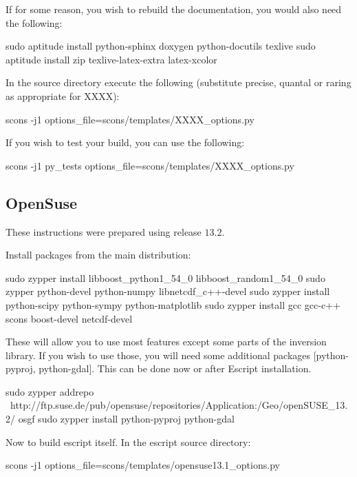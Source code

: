 \begin{optionalstep}
If for some reason, you wish to rebuild the documentation, you would also need the following:
\begin{shellCode}
sudo aptitude install python-sphinx doxygen python-docutils texlive 
sudo aptitude install zip texlive-latex-extra latex-xcolor 
\end{shellCode}
\end{optionalstep}

\noindent In the source directory execute the following (substitute precise, quantal or raring as appropriate for XXXX):
\begin{shellCode}
scons -j1 options_file=scons/templates/XXXX_options.py
\end{shellCode}

\noindent If you wish to test your build, you can use the following:
\begin{shellCode}
scons -j1 py_tests options_file=scons/templates/XXXX_options.py 
\end{shellCode}



\subsection{OpenSuse}\label{sec:susesrc}
These instructions were prepared using release $13.2$.

\noindent Install packages from the main distribution:
\begin{shellCode}
sudo zypper install libboost_python1_54_0 libboost_random1_54_0 
sudo zypper python-devel python-numpy libnetcdf_c++-devel
sudo zypper install python-scipy python-sympy python-matplotlib 
sudo zypper install gcc gcc-c++ scons boost-devel netcdf-devel
\end{shellCode}
These will allow you to use most features except some parts of the \downunder inversion library.
If you wish to use those, you will need some additional packages [python-pyproj, python-gdal].
This can be done now or after Escript installation.

\begin{shellCode}
sudo zypper addrepo \ 
 http://ftp.suse.de/pub/opensuse/repositories/Application:/Geo/openSUSE_13.2/ osgf
sudo zypper install python-pyproj python-gdal
\end{shellCode}

Now to build escript itself.
In the escript source directory:
\begin{shellCode}
scons -j1 options_file=scons/templates/opensuse13.1_options.py
\end{shellCode}

